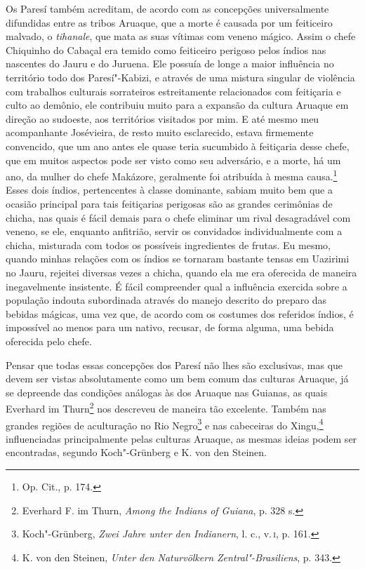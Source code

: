 Os Paresí também acreditam, de acordo com as concepções universalmente
difundidas entre as tribos Aruaque, que a morte é causada por um
feiticeiro malvado, o \emph{tihanale}, que mata as suas vítimas com
veneno mágico. Assim o chefe Chiquinho do Cabaçal era temido como
feiticeiro perigoso pelos índios nas nascentes do Jauru e do Juruena.
Ele possuía de longe a maior influência no território todo dos
Paresí"-Kabizi, e através de uma mistura singular de violência com
trabalhos culturais sorrateiros estreitamente relacionados com
feitiçaria e culto ao demônio, ele contribuiu muito para a expansão da
cultura Aruaque em direção ao sudoeste, aos territórios visitados por
mim. E até mesmo meu acompanhante Josévieira, de resto muito
esclarecido, estava firmemente convencido, que um ano antes ele quase
teria sucumbido à feitiçaria desse chefe, que em muitos aspectos pode
ser visto como seu adversário, e a morte, há um ano, da mulher do chefe
Makázore, geralmente foi atribuída à mesma causa.\footnote{Op. Cit., p.
  174.} Esses dois índios, pertencentes à classe dominante, sabiam
muito bem que a ocasião principal para tais feitiçarias perigosas são
as grandes cerimônias de chicha, nas quais é fácil demais para o chefe
eliminar um rival desagradável com veneno, se ele, enquanto anfitrião,
servir os convidados individualmente com a chicha, misturada com todos
os possíveis ingredientes de frutas. Eu mesmo, quando minhas relações
com os índios se tornaram bastante tensas em Uazirimi no Jauru,
rejeitei diversas vezes a chicha, quando ela me era oferecida de
maneira inegavelmente insistente. É fácil compreender qual a influência
exercida sobre a população indouta subordinada através do manejo
descrito do preparo das bebidas mágicas, uma vez que, de acordo com os
costumes dos referidos índios, é impossível ao menos para um nativo,
recusar, de forma alguma, uma bebida oferecida pelo chefe.

Pensar que todas essas concepções dos Paresí não lhes são exclusivas,
mas que devem ser vistas absolutamente como um bem comum das culturas
Aruaque, já se depreende das condições análogas às dos Aruaque nas
Guianas, as quais Everhard im Thurn\footnote{Everhard F. im Thurn,
  \emph{Among the Indians of Guiana}, p. 328 s.} nos descreveu de
maneira tão excelente. Também nas grandes regiões de aculturação no Rio
Negro\footnote{Koch"-Grünberg, \emph{Zwei Jahre unter den Indianern}, l.
  c., v.\,\textsc{i}, p. 161.} e nas cabeceiras do Xingu,\footnote{K. von den
  Steinen, \emph{Unter den Naturvölkern Zentral"-Brasiliens}, p. 343.}
influenciadas principalmente pelas culturas Aruaque, as mesmas ideias
podem ser encontradas, segundo Koch"-Grünberg e K. von den Steinen.

